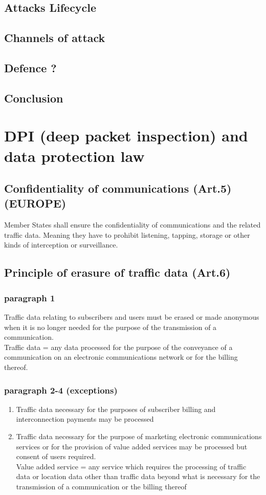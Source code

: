 \documentclass[10pt,a4paper]{report}
\begin{document}
\section{Attacks Lifecycle}
\section{Channels of attack}
\section{Defence ?}
\section{Conclusion}
\chapter{DPI (deep packet inspection) and data protection law}
\section{Confidentiality of communications (Art.5)(EUROPE)}
Member States shall ensure the  confidentiality of communications and the related traffic data. Meaning they have to prohibit listening, tapping, storage or other kinds of interception or  surveillance.
\section{Principle of erasure of traffic data (Art.6)}
\subsection{paragraph 1}
Traffic data relating to subscribers and users must be erased or made anonymous when it is no longer needed for the purpose of the transmission of a communication.\\
Traffic data =  any data processed for the purpose of the conveyance of a communication on an electronic communications network or for the billing thereof.
\subsection{paragraph 2-4 (exceptions)}
\begin{enumerate}
\item Traffic data necessary for the purposes of subscriber billing and interconnection payments may be processed 
\item Traffic data necessary for the purpose of marketing electronic communications services or for the provision of value added services may be processed but consent of users required.\\ Value added service = any service which requires the processing of traffic data or location data other than traffic data beyond what is necessary for the transmission of a communication or the billing thereof 
\end{enumerate}
\end{document}

